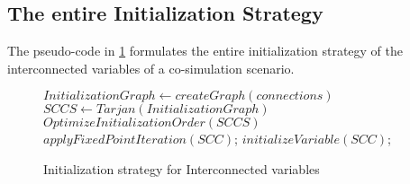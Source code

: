 \subsection{The entire Initialization Strategy}
The pseudo-code in \cref{alg:initialization} formulates the entire initialization strategy of the interconnected variables of a co-simulation scenario.
\begin{figure}[htb]
  \centering
    \begin{algorithm}[H]
    \caption{Initialization strategy for Interconnected variables}
    \label{alg:initialization}
      \begin{algorithmic}[1]
        \State $InitializationGraph \gets createGraph(connections)$
        \State $SCCS \gets Tarjan(InitializationGraph)$
        \State $OptimizeInitializationOrder(SCCS)$
                \State $applyFixedPointIteration(SCC)$;
            \Else
                \State $initializeVariable(SCC)$;
            \EndIf
        \EndFor
        \end{algorithmic}
    \end{algorithm}
\end{figure}

